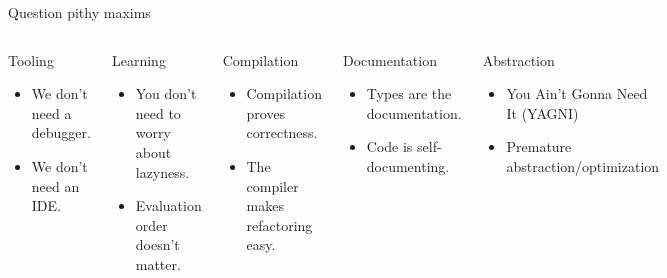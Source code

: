 \documentclass[aspectratio=169,ignorenonframetext]{beamer}
\begin{document}
\begin{frame}{Question pithy maxims}
	\begin{columns}
		\begin{alertblock}{Tooling}
		  \begin{itemize}
			\item We don't need a debugger.
			\item We don't need an IDE.
		  \end{itemize}
		\end{alertblock}
		\begin{alertblock}{Learning}
		  \begin{itemize}
			\item You don't need to worry about lazyness.
			\item Evaluation order doesn't matter.
		  \end{itemize}
		\end{alertblock}
		\begin{alertblock}{Compilation}
		  \begin{itemize}
			\item Compilation proves correctness.
			\item The compiler makes refactoring easy.
		  \end{itemize}
		\end{alertblock}
		\begin{alertblock}{Documentation}
		  \begin{itemize}
			\item Types are the documentation.
			\item Code is self-documenting.
		  \end{itemize}
		\end{alertblock}
		\begin{alertblock}{Abstraction}
		  \begin{itemize}
			\item You Ain't Gonna Need It (YAGNI)
			\item Premature abstraction/optimization
		  \end{itemize}
		\end{alertblock}
	\end{columns}
\end{frame}
\end{document}

